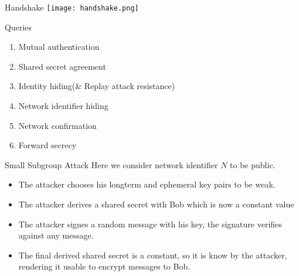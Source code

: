 \documentclass{beamer}
\begin{document}
\begin{frame}{Handshake}
  \texttt{[image: handshake.png]}
\end{frame}


\begin{frame}{Queries}
  \begin{enumerate}
    \item  Mutual authentication
      {\tabto{8cm}\textcolor{green!80!black}{{\large\Checkedbox}}}
    \item Shared secret agreement
      {\tabto{8cm}\textcolor{green!80!black}{{\large\Checkedbox}}}
    \item Identity hiding(\& Replay attack resistance)
      {\tabto{8cm}\textcolor{green!80!black}{{\large\Checkedbox}}}
    \item Network identifier hiding
      {\tabto{8cm}\textcolor{green!80!black}{{\large\Checkedbox}}}
    \item Network confirmation
      {\tabto{8cm}\textcolor{green!80!black}{{\large\Checkedbox}}}
    \item Forward secrecy
      {\tabto{8cm}\textcolor{green!80!black}{{\large\Checkedbox}}}
    \end{enumerate}
\end{frame}


\begin{frame}{Small Subgroup Attack}
Here we consider network identifier $N$ to be public.
\begin{itemize}
  \item The attacker chooses his longterm and ephemeral key pairs to be weak.
  \item The attacker derives a shared secret with Bob which is now a constant value
  \item The attacker signes a random message with his key, the signature verifies against any message.
  \item The final derived shared secret is a constant, so it is know by the attacker, rendering it usable to encrypt messages to Bob.
\end{itemize}
\end{frame}

\end{document}

